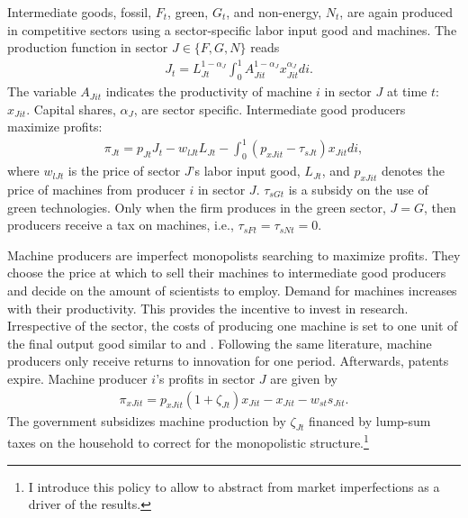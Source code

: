Intermediate goods, fossil, $F_t$, green, $G_t$, and non-energy, $N_t$, are again produced in competitive sectors using a sector-specific labor input good and machines. The production function in sector $J\in \{F,G,N\}$ reads
\begin{align*}
	&J_{t}= L_{Jt}^{1-\alpha_J}\int_{0}^{1}A_{Jit}^{1-\alpha_J}x_{Jit}^{\alpha_J} di.
\end{align*}
The variable $A_{Jit}$ indicates the productivity of machine $i$ in sector $J$ at time $t$: $x_{Jit}$. 
Capital shares, $\alpha_J$, are sector specific. 
Intermediate good producers maximize profits: 
\begin{align*}
	\pi_{Jt}=p_{Jt}J_t-w_{lJt}L_{Jt}-\int_{0}^{1}\left(p_{xJit}-\tau_{sJt}\right)x_{Jit}di,
\end{align*}
where $w_{lJt}$ is the price of sector $J$'s labor input good, $L_{Jt}$, and $p_{xJit}$ denotes the price of machines from producer $i$ in sector $J$. 
$\tau_{sGt}$ is a subsidy on the use of green technologies. 
Only when the firm produces in the green sector, $J=G$, then producers receive a tax on machines, i.e., $\tau_{sFt}=\tau_{sNt}=0$.


Machine producers are imperfect monopolists searching to maximize profits. They choose the price at which to sell their machines to intermediate good producers and decide on the amount of scientists to employ. Demand for machines increases with their productivity. This provides the incentive to invest in research. Irrespective of the sector, the costs of producing one machine is set to one unit of the final output good similar to \cite{Fried2018ClimateAnalysis} and \cite{Acemoglu2012TheChange}. 
Following the same literature, machine producers only receive returns to innovation for one period. Afterwards, patents expire. Machine producer $i$'s profits in sector $J$ are given by
\begin{align*}
	\pi_{xJit}=p_{xJit}(1+\zeta_{Jt})x_{Jit}-x_{Jit}-w_{st}s_{Jit}.
\end{align*}
The government subsidizes machine production by $\zeta_{Jt}$ financed by lump-sum taxes on the household to correct for the monopolistic structure.\footnote{I introduce this policy to allow to abstract from market imperfections as a driver of the results.} 

